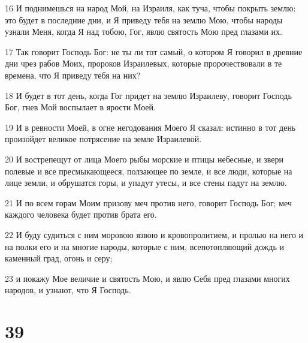 \par 16 И поднимешься на народ Мой, на Израиля, как туча, чтобы покрыть землю: это будет в последние дни, и Я приведу тебя на землю Мою, чтобы народы узнали Меня, когда Я над тобою, Гог, явлю святость Мою пред глазами их.
\par 17 Так говорит Господь Бог: не ты ли тот самый, о котором Я говорил в древние дни чрез рабов Моих, пророков Израилевых, которые пророчествовали в те времена, что Я приведу тебя на них?
\par 18 И будет в тот день, когда Гог придет на землю Израилеву, говорит Господь Бог, гнев Мой воспылает в ярости Моей.
\par 19 И в ревности Моей, в огне негодования Моего Я сказал: истинно в тот день произойдет великое потрясение на земле Израилевой.
\par 20 И вострепещут от лица Моего рыбы морские и птицы небесные, и звери полевые и все пресмыкающееся, ползающее по земле, и все люди, которые на лице земли, и обрушатся горы, и упадут утесы, и все стены падут на землю.
\par 21 И по всем горам Моим призову меч против него, говорит Господь Бог; меч каждого человека будет против брата его.
\par 22 И буду судиться с ним моровою язвою и кровопролитием, и пролью на него и на полки его и на многие народы, которые с ним, всепотопляющий дождь и каменный град, огонь и серу;
\par 23 и покажу Мое величие и святость Мою, и явлю Себя пред глазами многих народов, и узнают, что Я Господь.

\chapter{39}

